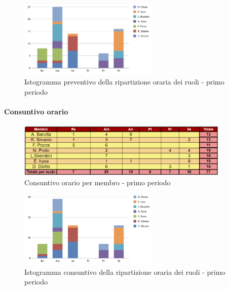 \begin{figure}[H]
    \centering
    \includegraphics[width=0.6\textwidth]{../Images/preventivoDivisioneRuoli1Periodo.png}
    \caption{Istogramma preventivo della ripartizione oraria dei ruoli - primo periodo}
    \label{fig:PvD1}
\end{figure}

\paragraph{Consuntivo orario } \hspace{1pt}

\begin{figure}[ht]
    \centering
    \includegraphics[width=0.9\textwidth]{../Images/consuntivoOrario1Periodo.png}
    \caption{Consuntivo orario per membro - primo periodo}
    \label{fig:Cv1}
\end{figure}

\begin{figure}[H]
    \centering
    \includegraphics[width=0.6\textwidth]{../Images/consuntivoDivisioneRuoli1Periodo.png}
    \caption{Istogramma consuntivo della ripartizione oraria dei ruoli - primo periodo}
    \label{fig:CD1}
\end{figure}
